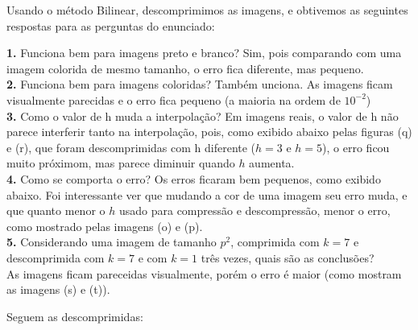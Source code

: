 \documentclass[12pt,letterpaper]{article}
\begin{document}
	Usando o método Bilinear, descomprimimos as imagens, e obtivemos as seguintes respostas para as perguntas do enunciado:
	
	\textbf{1.} Funciona bem para imagens preto e branco?
	Sim, pois comparando com uma imagem colorida de mesmo tamanho, o erro fica diferente, mas pequeno.\\
	
	\textbf{2.} Funciona bem para imagens coloridas?
	Também unciona. As imagens ficam visualmente parecidas e o erro fica pequeno (a maioria na ordem de $10^{-2}$)\\
	
	\textbf{3.} Como o valor de h muda a interpolação? 
	Em imagens reais, o valor de h não parece interferir tanto na interpolação, pois, como exibido abaixo pelas figuras (q) e (r), que foram descomprimidas com h diferente ($h = 3$ e $h = 5$), o erro ficou muito próximom, mas parece diminuir quando $h$ aumenta.\\
	
	\textbf{4.} Como se comporta o erro?
	Os erros ficaram bem pequenos, como exibido abaixo. Foi interessante ver que mudando a cor de uma imagem seu erro muda, e que quanto menor o $h$ usado para compressão e descompressão, menor o erro, como mostrado pelas imagens (o) e (p). \\
	
	\textbf{5.} Considerando uma imagem de tamanho $p^2$, comprimida com $k = 7$ e descomprimida com $k = 7$ e com $k = 1$ três vezes, quais são as conclusões?\\
	As imagens ficam pareceidas visualmente, porém o erro é maior (como mostram as imagens (s) e (t)).
	
	Seguem as descomprimidas:
	
	\begin{figure}[h]
	\end{figure}
	
	\begin{figure}[h]
	\end{figure}
	
\end{document}
